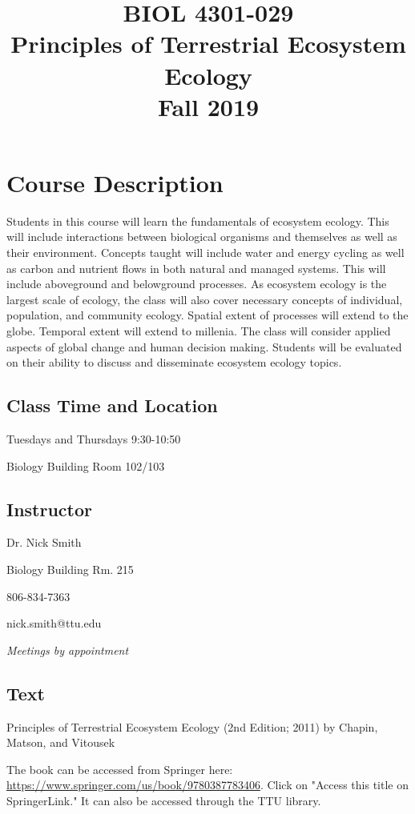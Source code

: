 \documentclass[12pt, notitlepage]{article}   	%
\title{
	\textbf{
		BIOL 4301-029
	} \\
	\large Principles of Terrestrial Ecosystem Ecology \\
	\large Fall 2019
}
\date{\vspace{-5ex}}
\begin{document}
{\selectfont %

\maketitle

\section{Course Description}
Students in this course will learn the fundamentals of ecosystem ecology.
This will include interactions between biological organisms and themselves as well as
their environment. Concepts taught will include water and energy cycling as well as carbon
and nutrient flows in both natural and managed systems.
This will include aboveground and belowground processes.
As ecosystem ecology is the largest scale of ecology, the class will also cover necessary
concepts of individual, population, and community ecology.
Spatial extent of processes will extend to the globe. Temporal extent will extend to 
millenia. The class will consider applied aspects of global change and human decision making.
Students will be evaluated on their 
ability to discuss and disseminate ecosystem ecology topics.

\subsection{Class Time and Location}
Tuesdays and Thursdays 9:30-10:50

Biology Building Room 102/103

\subsection{Instructor}
Dr. Nick Smith \par
Biology Building Rm. 215 \par
806-834-7363 \par
nick.smith@ttu.edu \par
\textit{Meetings by appointment}

\subsection{Text}
Principles of Terrestrial Ecosystem Ecology (2nd Edition; 2011) 
by Chapin, Matson, and Vitousek \par
The book can be accessed from Springer here: 
\url{https://www.springer.com/us/book/9780387783406}. Click on "Access this title on 
SpringerLink." It can also be accessed through the TTU library.

}
\end{document}
